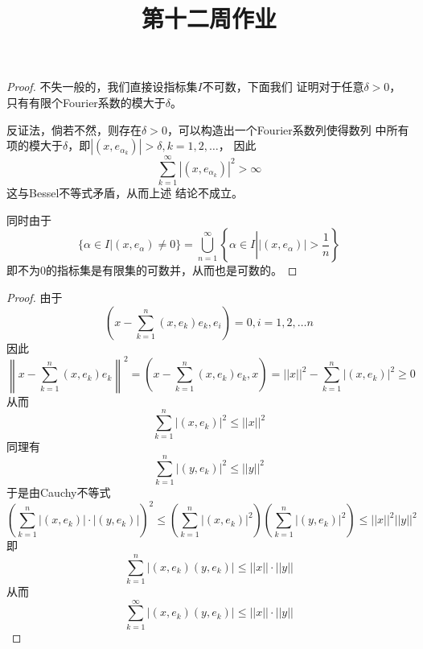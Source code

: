 \documentclass[cn]{homework}
\title{第十二周作业}
\begin{document}
    \maketitle

    \problem

    \problem

    \problem
    \begin{proof}
        不失一般的，我们直接设指标集$I$不可数，下面我们
        证明对于任意$\delta>0$，只有有限个Fourier系数的模大于$\delta$。

        反证法，倘若不然，则存在$\delta>0$，可以构造出一个Fourier系数列使得数列
        中所有项的模大于$\delta$，即$|(x,e_{\alpha_k})|>\delta,k=1,2,\ldots$，
        因此
        \[\sum_{k=1}^\infty|(x,e_{\alpha_k})|^2>\infty\]
        这与Bessel不等式矛盾，从而上述
        结论不成立。

        同时由于
        \[\{\alpha\in I|(x,e_\alpha)\neq 0\}
        =\bigcup_{n=1}^\infty\left\{\alpha\in I\left||(x,e_\alpha)|>\frac{1}{n}\right.\right\}\]
        即不为0的指标集是有限集的可数并，从而也是可数的。
    \end{proof}

    \problem
    \begin{proof}
        由于
        \[\left(x-\sum_{k=1}^n(x,e_k)e_k,e_i\right)=0,i=1,2,\ldots n\]
        因此
        \[\left\|x-\sum_{k=1}^n(x,e_k)e_k\right\|^2
        =\left(x-\sum_{k=1}^n(x,e_k)e_k,x\right)
        =||x||^2-\sum_{k=1}^n|(x,e_k)|^2\geq 0\]
        从而
        \[\sum_{k=1}^n|(x,e_k)|^2\leq ||x||^2\]
        同理有
        \[\sum_{k=1}^n|(y,e_k)|^2\leq ||y||^2\]
        于是由Cauchy不等式
        \[\left(\sum_{k=1}^n|(x,e_k)|\cdot|(y,e_k)|\right)^2
        \leq
        \left(\sum_{k=1}^n|(x,e_k)|^2\right)
        \left(\sum_{k=1}^n|(y,e_k)|^2\right)
        \leq ||x||^2||y||^2\]
        即
        \[\sum_{k=1}^n|(x,e_k)(y,e_k)|\leq
        ||x||\cdot||y||\]
        从而
        \[\sum_{k=1}^\infty|(x,e_k)(y,e_k)|\leq ||x||\cdot||y||\]


    \end{proof}
\end{document}

